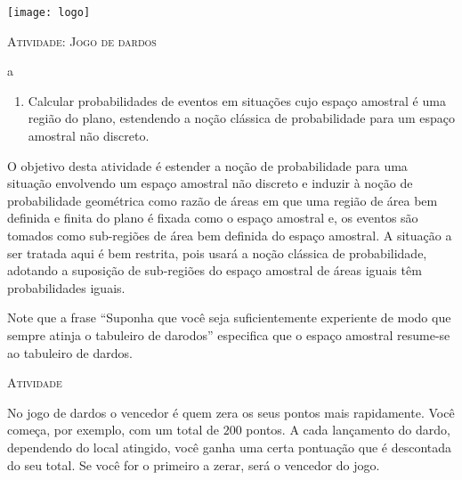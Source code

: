 \documentclass[10 pt,usenames,dvipsnames, oneside]{article}
\begin{document}
\begin{center}
  \begin{minipage}[l]{3cm}
\texttt{[image: logo]}    
\end{minipage}\hfill
\begin{minipage}[r]{.8\textwidth}
 {\Large \scshape Atividade: Jogo de dardos}  
\end{minipage}
\end{center}
\vspace{.2cm}

\ifdefined\prof
\begin{objetivos}
\item a
\end{objetivos}

\begin{goals}
\begin{enumerate}
\item Calcular probabilidades de eventos em situações cujo espaço amostral é uma região do plano, estendendo a noção clássica de probabilidade para um espaço amostral não discreto.
\end{enumerate}

\tcblower

O objetivo desta atividade é estender a noção de probabilidade para uma situação envolvendo um espaço amostral não discreto e induzir à noção de probabilidade geométrica como razão de áreas em que uma região de área bem definida e finita do plano é fixada como o espaço amostral e, os eventos são tomados como sub-regiões de área bem definida do espaço amostral. A situação a ser tratada aqui é bem restrita, pois usará a noção clássica de probabilidade, adotando a suposição de sub-regiões do espaço amostral de áreas iguais têm probabilidades iguais.

Note que a frase “Suponha que você seja suficientemente experiente de modo que sempre atinja o tabuleiro de darodos”{} especifica que o espaço amostral resume-se ao tabuleiro de dardos.
\end{goals}

\bigskip
\begin{center}
{\large \scshape Atividade}
\end{center}
\fi

No jogo de dardos o vencedor é quem zera os seus pontos mais rapidamente. Você começa, por exemplo, com um total de $200$ pontos. A cada lançamento do dardo, dependendo do local atingido, você ganha uma certa pontuação que é descontada do seu total. Se você for o primeiro a zerar, será o vencedor do jogo.
\end{document}
